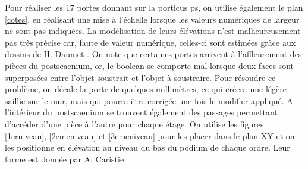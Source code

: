 Pour réaliser les 17 portes donnant sur la \gls{porticus ps}, on utilise également le plan \ref{cotes}, en réalisant une mise à l'échelle lorsque les valeurs numériques de largeur ne sont pas indiquées. La modélisation de leurs élévations n'est malheureusement pas très précise car, faute de valeur numérique, celles-ci sont estimées grâce aux dessins de H. Daumet \cite[Pl. XII, XIII, XIV]{orangePl}. On note que certaines portes arrivent à l'affleurement des pièces du \gls{postscaenium}, or, le \gls{boolean} se comporte mal lorsque deux faces sont superposées entre l'objet soustrait et l'objet à soustraire. Pour résoudre ce problème, on décale la porte de quelques millimètres, ce qui créera une légère saillie sur le mur, mais qui pourra être corrigée une fois le modifier appliqué. A l'intérieur du \gls{postscaenium} se trouvent également des passages permettant d'accéder d'une pièce à l'autre pour chaque étage. On utilise les figures \ref{1erniveau}, \ref{2emeniveau} et \ref{3emeniveau} pour les placer dans le plan XY et on les positionne en élévation au niveau du bas du \gls{podium} de chaque ordre. Leur forme est donnée par A. Caristie \cite[Pl. II]{orangePl}

